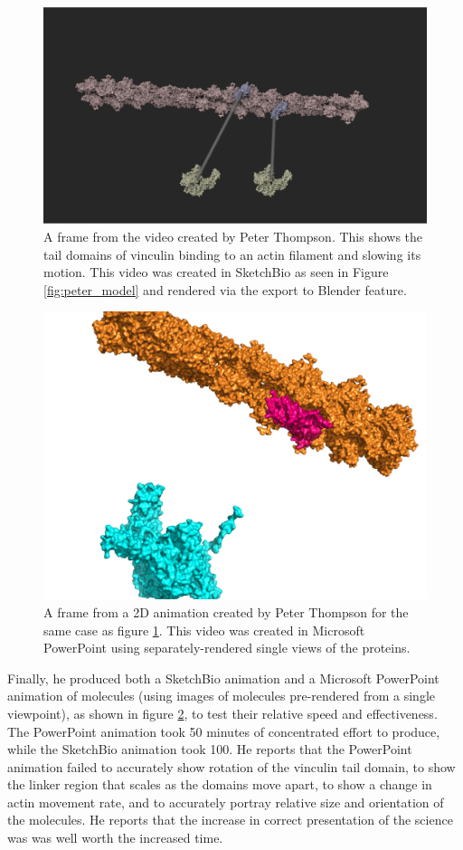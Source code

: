 \documentclass[twocolumn]{bmcart}%
\begin{document}
\begin{figure}[h!]
\centering
\includegraphics[width=0.9\columnwidth]{peter_video.png}
\caption{A frame from the video created by Peter Thompson.  This shows the tail domains of vinculin binding to an actin filament and slowing its motion.
This video was created in SketchBio as seen in Figure \ref{fig:peter_model} and rendered via the export to Blender feature.}
\label{fig:peter_video}
\end{figure}

\begin{figure}[h!]
\centering
\includegraphics[width=0.9\columnwidth]{peter_powerpoint_animation.png}
\caption{A frame from a 2D animation created by Peter Thompson for the same case as figure \ref{fig:peter_video}.
This video was created in Microsoft PowerPoint using separately-rendered single views of the proteins.}
\label{fig:peter_powerpoint}
\end{figure}

Finally, he produced both a SketchBio animation and a Microsoft PowerPoint animation of molecules (using images of molecules pre-rendered from a single viewpoint), as shown in figure \ref{fig:peter_powerpoint}, to test their relative speed and effectiveness.
The PowerPoint animation took 50 minutes of concentrated effort to produce, while the SketchBio animation took 100. He reports that the PowerPoint animation failed to accurately show rotation of the vinculin tail domain, to show the linker region that scales as the domains move apart, to show a change in actin movement rate, and to accurately portray relative size and orientation of the molecules.  He reports that the increase in correct presentation of the science was was well worth the increased time.
\end{document}

